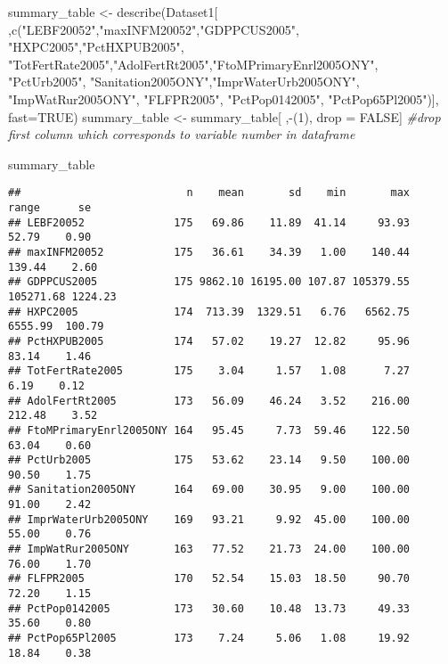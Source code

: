 \documentclass[
]{article}
\newenvironment{Shaded}{\begin{snugshade}}{\end{snugshade}}
\newcommand{\AttributeTok}[1]{\textcolor[rgb]{0.77,0.63,0.00}{#1}}
\newcommand{\CommentTok}[1]{\textcolor[rgb]{0.56,0.35,0.01}{\textit{#1}}}
\newcommand{\ConstantTok}[1]{\textcolor[rgb]{0.00,0.00,0.00}{#1}}
\newcommand{\DecValTok}[1]{\textcolor[rgb]{0.00,0.00,0.81}{#1}}
\newcommand{\FunctionTok}[1]{\textcolor[rgb]{0.00,0.00,0.00}{#1}}
\newcommand{\NormalTok}[1]{#1}
\newcommand{\OtherTok}[1]{\textcolor[rgb]{0.56,0.35,0.01}{#1}}
\newcommand{\SpecialCharTok}[1]{\textcolor[rgb]{0.00,0.00,0.00}{#1}}
\newcommand{\StringTok}[1]{\textcolor[rgb]{0.31,0.60,0.02}{#1}}
\begin{document}
\begin{Shaded}
\begin{Highlighting}[]
\NormalTok{summary\_table }\OtherTok{\textless{}{-}} \FunctionTok{describe}\NormalTok{(Dataset1[ ,}\FunctionTok{c}\NormalTok{(}\StringTok{"LEBF20052"}\NormalTok{,}\StringTok{"maxINFM20052"}\NormalTok{,}\StringTok{"GDPPCUS2005"}\NormalTok{, }\StringTok{"HXPC2005"}\NormalTok{,}\StringTok{"PctHXPUB2005"}\NormalTok{,}
                   \StringTok{"TotFertRate2005"}\NormalTok{,}\StringTok{"AdolFertRt2005"}\NormalTok{,}\StringTok{"FtoMPrimaryEnrl2005ONY"}\NormalTok{,}
                   \StringTok{"PctUrb2005"}\NormalTok{, }\StringTok{"Sanitation2005ONY"}\NormalTok{,}\StringTok{"ImprWaterUrb2005ONY"}\NormalTok{,}
                   \StringTok{"ImpWatRur2005ONY"}\NormalTok{, }\StringTok{"FLFPR2005"}\NormalTok{, }\StringTok{"PctPop0142005"}\NormalTok{, }\StringTok{"PctPop65Pl2005"}\NormalTok{)],}
                  \AttributeTok{fast=}\ConstantTok{TRUE}\NormalTok{) }
\NormalTok{summary\_table }\OtherTok{\textless{}{-}}\NormalTok{ summary\_table[ ,}\SpecialCharTok{{-}}\NormalTok{(}\DecValTok{1}\NormalTok{), drop }\OtherTok{=} \ConstantTok{FALSE}\NormalTok{] }\CommentTok{\#drop first column which corresponds to variable number in dataframe}

\NormalTok{summary\_table}
\end{Highlighting}
\end{Shaded}

\begin{verbatim}
##                          n    mean       sd    min       max     range      se
## LEBF20052              175   69.86    11.89  41.14     93.93     52.79    0.90
## maxINFM20052           175   36.61    34.39   1.00    140.44    139.44    2.60
## GDPPCUS2005            175 9862.10 16195.00 107.87 105379.55 105271.68 1224.23
## HXPC2005               174  713.39  1329.51   6.76   6562.75   6555.99  100.79
## PctHXPUB2005           174   57.02    19.27  12.82     95.96     83.14    1.46
## TotFertRate2005        175    3.04     1.57   1.08      7.27      6.19    0.12
## AdolFertRt2005         173   56.09    46.24   3.52    216.00    212.48    3.52
## FtoMPrimaryEnrl2005ONY 164   95.45     7.73  59.46    122.50     63.04    0.60
## PctUrb2005             175   53.62    23.14   9.50    100.00     90.50    1.75
## Sanitation2005ONY      164   69.00    30.95   9.00    100.00     91.00    2.42
## ImprWaterUrb2005ONY    169   93.21     9.92  45.00    100.00     55.00    0.76
## ImpWatRur2005ONY       163   77.52    21.73  24.00    100.00     76.00    1.70
## FLFPR2005              170   52.54    15.03  18.50     90.70     72.20    1.15
## PctPop0142005          173   30.60    10.48  13.73     49.33     35.60    0.80
## PctPop65Pl2005         173    7.24     5.06   1.08     19.92     18.84    0.38
\end{verbatim}
\end{document}
